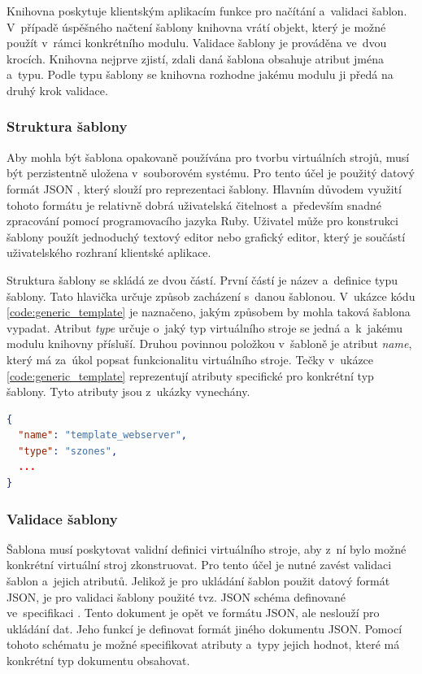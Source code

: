 Knihovna poskytuje klientským aplikacím funkce pro načítání a~validaci šablon. V~případě úspěšného načtení šablony
knihovna vrátí objekt, který je možné použít v~rámci konkrétního modulu. Validace šablony je prováděna ve~dvou
krocích. Knihovna nejprve zjistí, zdali daná šablona obsahuje atribut jména a~typu. Podle typu šablony se knihovna rozhodne
jakému modulu ji předá na druhý krok validace.
\subsubsection{Struktura šablony}
\label{chapter:implementation:library:generic:structure}
Aby mohla být šablona opakovaně používána pro tvorbu virtuálních strojů, musí být perzistentně uložena v~souborovém systému.
Pro tento účel je použitý datový formát JSON \cite{json}, který slouží pro reprezentaci šablony. Hlavním důvodem využití tohoto
formátu je relativně dobrá uživatelská čitelnost a~především snadné zpracování pomocí programovacího jazyka Ruby. Uživatel
může pro konstrukci šablony použít jednoduchý textový editor nebo grafický editor, který je součástí uživatelského rozhraní
klientské aplikace. 

Struktura šablony se skládá ze dvou částí. První částí je název a~definice typu šablony. Tato hlavička určuje
způsob zacházení s~danou šablonou. V~ukázce kódu \ref{code:generic_template} je naznačeno, jakým způsobem by mohla taková šablona vypadat.
Atribut \textit{type} určuje o~jaký typ virtuálního stroje se jedná a~k~jakému modulu knihovny přísluší. Druhou povinnou položkou
v~šabloně je atribut \textit{name}, který má za~úkol popsat funkcionalitu virtuálního stroje. Tečky v~ukázce
\ref{code:generic_template} reprezentují atributy specifické pro konkrétní typ šablony. Tyto atributy jsou z~ukázky vynechány.
\begin{lstlisting}[language=json, caption={Generická šablona}, float,label={code:generic_template}]  
{
  "name": "template_webserver",
  "type": "szones",
  ...
}
\end{lstlisting}
\subsubsection{Validace šablony}
\label{chapter:implementation:library:generic:validation}
Šablona musí poskytovat validní definici virtuálního stroje, aby z~ní bylo možné konkrétní virtuální stroj zkonstruovat.
Pro tento účel je nutné zavést validaci šablon a~jejich atributů. Jelikož je pro ukládání šablon použit datový formát JSON,
je pro validaci šablony použité tvz. JSON schéma definované ve~specifikaci \cite{json:schema}. Tento dokument je opět ve formátu
JSON, ale neslouží pro ukládání dat. Jeho funkcí je definovat formát jiného dokumentu JSON. Pomocí tohoto schématu
je možné specifikovat atributy a~typy jejich hodnot, které má konkrétní typ dokumentu obsahovat.

